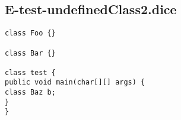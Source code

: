 \subsection{E-test-undefinedClass2.dice}
\begin{verbatim}
class Foo {}

class Bar {}

class test {
public void main(char[][] args) {
class Baz b;
}
}

\end{verbatim}